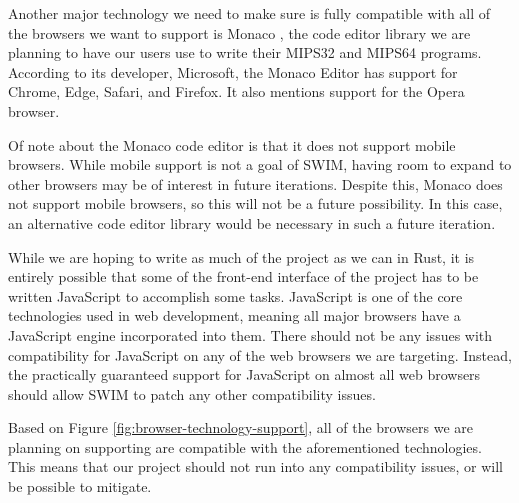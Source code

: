 \documentclass[
    paper=letter,
    parskip=half,
    fontsize=12pt,
    titlepage=firstiscover,
    toc=bibliography,
    numbers=endperiod
]{scrartcl}
\begin{document}
Another major technology we need to make sure is fully compatible with
all of the browsers we want to support is Monaco \cite{monaco}, the code
editor library we are planning to have our users use to write their
MIPS32 and MIPS64 programs. According to its developer, Microsoft, the
Monaco Editor has support for Chrome, Edge, Safari, and Firefox. It also
mentions support for the Opera browser.

Of note about the Monaco code editor is that it does not support mobile
browsers. While mobile support is not a goal of SWIM, having room to
expand to other browsers may be of interest in future iterations.
Despite this, Monaco does not support mobile browsers, so this will not
be a future possibility. In this case, an alternative code editor
library would be necessary in such a future iteration.

While we are hoping to write as much of the project as we can in Rust,
it is entirely possible that some of the front-end interface of the
project has to be written JavaScript to accomplish some tasks.
JavaScript is one of the core technologies used in web development,
meaning all major browsers have a JavaScript engine incorporated into
them. There should not be any issues with compatibility for JavaScript
on any of the web browsers we are targeting. Instead, the practically
guaranteed support for JavaScript on almost all web browsers should
allow SWIM to patch any other compatibility issues.

Based on Figure \ref{fig:browser-technology-support}, all of the
browsers we are planning on supporting are compatible with the
aforementioned technologies. This means that our project should not run
into any compatibility issues, or will be possible to mitigate.
\end{document}
